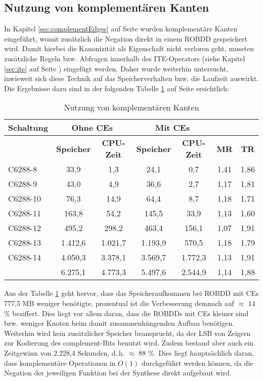 \subsection{Nutzung von komplementären Kanten}
\label{sec:bddCom}
In Kapitel \ref{sec:complementEdges} auf Seite \pageref{sec:complementEdges} wurden komplementäre Kanten eingeführt, womit zusätzlich die Negation direkt in einem ROBDD gespeichert wird. Damit hierbei die Kanonizität als Eigenschaft nicht verloren geht, mussten zusätzliche Regeln bzw. Abfragen innerhalb des ITE-Operators (siehe Kapitel \ref{sec:ite} auf Seite \pageref{sec:ite}) eingefügt werden. Daher wurde weiterhin untersucht, inwieweit sich diese Technik auf das Speicherverhalten bzw. die Laufzeit auswirkt. Die Ergebnisse dazu sind in der folgenden Tabelle \ref{tab:bddCom} auf Seite \pageref{tab:bddCom} ersichtlich:
\newpage
\begin{table}[bth]
	\footnotesize
	\centering
	\caption{Nutzung von komplementären Kanten}
	\label{tab:bddCom}
	\begin{tabular}{ | l | c | c | c | c | c | c |}
		\hline
		\multicolumn{1}{|c|}{\textbf{Schaltung}} & \multicolumn{2}{c|}{\textbf{Ohne CEs}} & \multicolumn{2}{c|}{\textbf{Mit CEs}} & \multicolumn{2}{c|}{~} \\ \hline
		~ & \multicolumn{1}{c|}{\textbf{Speicher}} & \multicolumn{1}{c|}{\textbf{CPU-Zeit}} & \multicolumn{1}{c|}{\textbf{Speicher}} & \multicolumn{1}{c|}{\textbf{CPU-Zeit}} & \multicolumn{1}{c|}{\textbf{MR}} & \multicolumn{1}{c|}{\textbf{TR}}\\ \hline
		C6288-8 & 33,9 & 1,3 & 24,1 & 0,7 & 1,41 & 1,86  \\ \hline
		C6288-9 & 43,0 & 4,9 & 36,6 & 2,7 & 1,17 & 1,81  \\ \hline
		C6288-10 & 76,3 & 14,9 & 64,4 & 8,7 & 1,18 & 1,71  \\ \hline
		C6288-11 & 163,8 & 54,2 & 145,5 & 33,9 & 1,13 & 1,60  \\ \hline
		C6288-12 & 495,2 & 298,2 & 463,4 & 156,1 & 1,07 & 1,91  \\ \hline
		C6288-13 & 1.412,6 & 1.021,7 & 1.193,9 & 570,5 & 1,18 & 1,79 \\ \hline
		C6288-14 & 4.050,3 & 3.378,1 & 3.569,7 & 1.772,3 & 1,13 & 1,91 \\ \hlineB{3}
		\multicolumn{1}{|c|}{\textbf{Gesamt}} & 6.275,1 & 4.773,3 & 5.497,6 & 2.544,9 & 1,14 & 1,88\\ \hline
	\end{tabular}
\end{table}
Aus der Tabelle \ref{tab:bddCom} geht hervor, dass das Speicheraufkommen bei ROBDD mit CEs 777,5 MB weniger benötigte, prozentual ist die Verbesserung demnach auf $\approx$ 14 \% beziffert. Dies liegt vor allem daran, dass die ROBDDs mit CEs kleiner sind bzw. weniger Knoten beim damit zusammenhängenden Aufbau benötigen. Weiterhin wird kein zusätzlicher Speicher beansprucht, da der LSB von Zeigern zur Kodierung des complement-Bits benutzt wird. Zudem bestand aber auch ein Zeitgewinn von 2.228,4 Sekunden, d.\,h. $\approx$ 88 \%. Dies liegt hauptsächlich daran, dass komplementäre Operationen in $O(1)$ durchgeführt werden können, da die Negation der jeweiligen Funktion bei der Synthese direkt aufgebaut wird.

